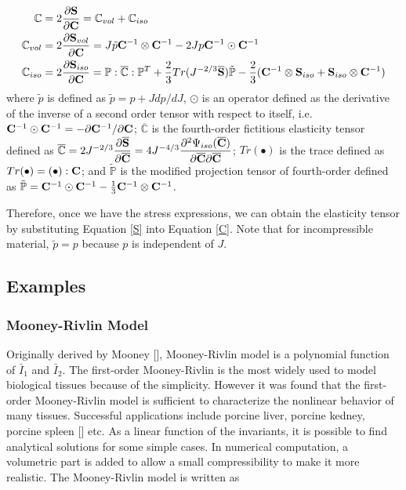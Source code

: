 \begin{subequations} 
\label{C}
\begin{align}
\mathbb{C} &= 2\frac{\partial{\bold{S}}}{\partial{\bold{C}}} = \mathbb{C}_{vol} + \mathbb{C}_{iso} 
\label{Ctotal} \\
\mathbb{C}_{vol} &= 2\frac{\partial{\bold{S}_{vol}}}{\partial{\bold{C}}} = 
J\tilde{p}\bold{C}^{-1}\otimes\bold{C}^{-1} - 2Jp\bold{C}^{-1}\odot\bold{C}^{-1} \label{Cvol} \\
\mathbb{C}_{iso} &= 2\frac{\partial{\bold{S}_{iso}}}{\partial{\bold{C}}} =
\mathbb{P} : \overline{\mathbb{C}} : \mathbb{P}^T + \frac{2}{3}Tr(J^{-2/3}\overline{\bold{S}})\tilde{\mathbb{P}} - \frac{2}{3}(\bold{C}^{-1}\otimes\bold{S}_{iso} + \bold{S}_{iso}\otimes \bold{C}^{-1})
\label{Ciso} 
\end{align}
\end{subequations}
where $\tilde{p}$ is defined as $\tilde{p} = p + J{dp}/{dJ}$, $\odot$ is an operator defined as the derivative of the inverse of a second order tensor with respect to itself, i.e. 
$\bold{C}^{-1}\odot\bold{C}^{-1} = - {\partial{\bold{C}^{-1}}} / {\partial{\bold{C}}}$; 
$\overline{\mathbb{C}}$ is the fourth-order fictitious elasticity tensor defined as 
$\overline{\mathbb{C}} = 2J^{-2/3}\dfrac{\partial{\overline{\bold{S}}}}{\partial{\overline{\bold{C}}}} = 4J^{-4/3} \dfrac{\partial^2\Psi_{iso}(\overline{\bold{C}})} {\partial{\overline{\bold{C}}}{\partial{\overline{\bold{C}}}}} $;
$Tr(\bullet)$ is the trace defined as $Tr(\bullet) = (\bullet) : \bold{C}$;
and $\tilde{\mathbb{P}}$ is the modified projection tensor of fourth-order defined as 
$\tilde{\mathbb{P}} = \bold{C}^{-1} \odot \bold{C}^{-1} -  \frac{1}{3}\bold{C}^{-1} \otimes \bold{C}^{-1}$.

Therefore, once we have the stress expressions, we can obtain the elasticity tensor by substituting Equation \ref{S} into Equation \ref{C}. Note that for incompressible material, $\tilde{p} = p$ because $p$ is independent of $J$.

%
\subsection {Examples}
\subsubsection{Mooney-Rivlin Model}
Originally derived by Mooney [], Mooney-Rivlin model is a polynomial function of $\bar{I}_1$ and $\bar{I}_2$. The first-order Mooney-Rivlin is the most widely used to model biological tissues because of the simplicity. However it was found that the first-order Mooney-Rivlin model is sufficient to characterize the nonlinear behavior of many tissues. Successful applications include porcine liver, porcine kedney, porcine spleen [] etc. As a linear function of the invariants, it is possible to find analytical solutions for some simple cases. In numerical computation, a volumetric part is added to allow a small compressibility to make it more realistic. The Mooney-Rivlin model is written as

